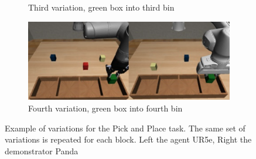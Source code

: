 \begin{figure}[hbt!]
\begin{subfigure}{0.3\textwidth}
        \caption{Third variation, green box into third bin}
        \label{fig:third_variation}
    \end{subfigure}
    \hspace{10px}
    \begin{subfigure}{0.3\textwidth}
        \centering
        \includegraphics[width=\textwidth]{Figures/images/pick_place/task_4.png}
        \caption{Fourth variation, green box into fourth bin}
        \label{fig:fourth_variation}
    \end{subfigure}
    \caption{Example of variations for the Pick and Place task. The same set of variations is repeated for each block. Left the agent UR5e, Right the demonstrator Panda}
    \label{fig:example_of_variations_for_pick_place}
\end{figure}

